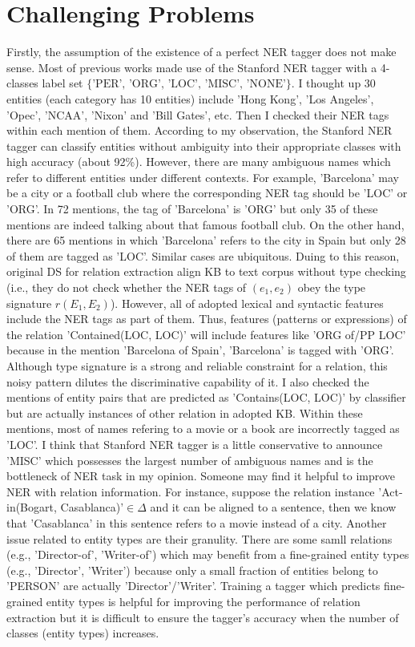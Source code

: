\documentclass[10pt]{article} %
\theoremstyle{definition}
\theoremstyle{definition}
\begin{document}
\section{Challenging Problems}
Firstly, the assumption of the existence of a perfect NER tagger does not make sense. 
Most of previous works made use of the Stanford NER tagger with a 4-classes label set $\{\text{'PER', 'ORG', 'LOC', 'MISC', 'NONE'}\}$. 
I thought up 30 entities (each category has 10 entities) include 'Hong Kong', 'Los Angeles', 'Opec', 'NCAA', 'Nixon' and 'Bill Gates', etc.
Then I checked their NER tags within each mention of them. 
According to my observation, the Stanford NER tagger can classify entities without ambiguity into their appropriate classes with high accuracy (about 92\%). 
However, there are many ambiguous names which refer to different entities under different contexts. 
For example, 'Barcelona' may be a city or a football club where the corresponding NER tag should be 'LOC' or 'ORG'. 
In 72 mentions, the tag of 'Barcelona' is 'ORG' but only 35 of these mentions are indeed talking about that famous football club. 
On the other hand, there are 65 mentions in which 'Barcelona' refers to the city in Spain but only 28 of them are tagged as 'LOC'. 
Similar cases are ubiquitous. 
Duing to this reason, original DS for relation extraction align KB to text corpus without type checking 
(i.e., they do not check whether the NER tags of $(e_1,e_2)$ obey the type signature $r(E_1,E_2)$). 
However, all of adopted lexical and syntactic features include the NER tags as part of them. 
Thus, features (patterns or expressions) of the relation 'Contained(LOC, LOC)' will include features like 'ORG of/PP LOC' 
because in the mention 'Barcelona of Spain', 'Barcelona' is tagged with 'ORG'. 
Although type signature is a strong and reliable constraint for a relation, this noisy pattern dilutes the discriminative capability of it. 
I also checked the mentions of entity pairs that are predicted as 'Contains(LOC, LOC)' by classifier but are actually instances of other relation in adopted KB. 
Within these mentions, most of names refering to a movie or a book are incorrectly tagged as 'LOC'. 
I think that Stanford NER tagger is a little conservative to announce 'MISC' which possesses the largest number of ambiguous names and is the bottleneck of NER task in my opinion. 
Someone may find it helpful to improve NER with relation information. 
For instance, suppose the relation instance 'Act-in(Bogart, Casablanca)'$\in\Delta$ and it can be aligned to a sentence, then we know that 'Casablanca' in this sentence refers to a movie instead of a city. 
Another issue related to entity types are their granulity. 
There are some samll relations (e.g., 'Director-of', 'Writer-of') which may benefit from a fine-grained entity types (e.g., 'Director', 'Writer') because only a small fraction of entities belong to 'PERSON' are actually 'Director'/'Writer'. 
Training a tagger which predicts fine-grained entity types is helpful for improving the performance of relation extraction but it is difficult to ensure the tagger's accuracy when the number of classes (entity types) increases. 
\end{document}
